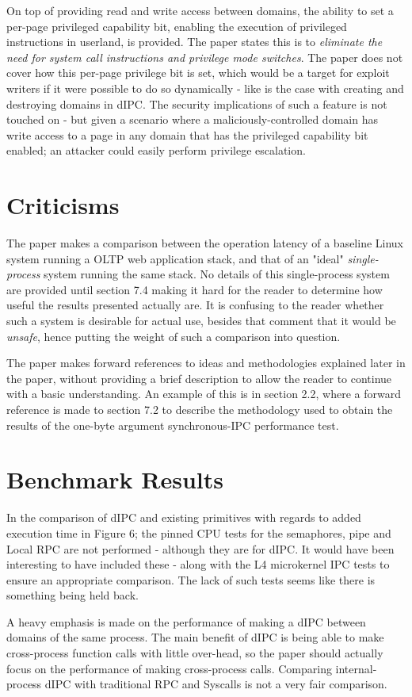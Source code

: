 \documentclass{article}
\begin{document}
On top of providing read and write access between domains, the ability to set a per-page privileged capability bit, enabling the execution of privileged instructions in userland, is provided. The paper states this is to \textit{eliminate the need for system call instructions and privilege mode switches}. The paper does not cover how this per-page privilege bit is set, which would be a target for exploit writers if it were possible to do so dynamically - like is the case with creating and destroying domains in dIPC. The security implications of such a feature is not touched on - but given a scenario where a maliciously-controlled domain has write access to a page in any domain that has the privileged capability bit enabled; an attacker could easily perform privilege escalation.


\section*{Criticisms}
The paper makes a comparison between the operation latency of a baseline Linux system running a OLTP web application stack, and that of an "ideal" \textit{single-process} system running the same stack. No details of this single-process system are provided until section 7.4 making it hard for the reader to determine how useful the results presented actually are. It is confusing to the reader whether such a system is desirable for actual use, besides that comment that it would be \textit{unsafe}, hence putting the weight of such a comparison into question.

The paper makes forward references to ideas and methodologies explained later in the paper, without providing a brief description to allow the reader to continue with a basic understanding. An example of this is in section 2.2, where a forward reference is made to section 7.2 to describe the methodology used to obtain the results of the one-byte argument synchronous-IPC performance test.


\section*{Benchmark Results}
In the comparison of dIPC and existing primitives with regards to added execution time in Figure 6; the pinned CPU tests for the semaphores, pipe and Local RPC are not performed - although they are for dIPC. It would have been interesting to have included these - along with the L4 microkernel IPC tests to ensure an appropriate comparison. The lack of such tests seems like there is something being held back.

A heavy emphasis is made on the performance of making a dIPC between domains of the same process. The main benefit of dIPC is being able to make cross-process function calls with little over-head, so the paper should actually focus on the performance of making cross-process calls. Comparing internal-process dIPC with traditional RPC and Syscalls is not a very fair comparison.



\nocite{*}


\end{document}
